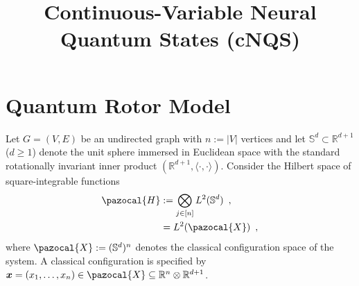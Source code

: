 \documentclass[12pt]{article}
\theoremstyle{definition}%
\theoremstyle{definition}
\theoremstyle{remark}
\begin{document}
\title{Continuous-Variable Neural Quantum States (cNQS)}

\maketitle
\tableofcontents
\section{Quantum Rotor Model}
Let $G = (V,E)$ be an undirected graph with $n:=|V|$ vertices and let $\mathbb{S}^d \subset \mathbb{R}^{d+1}$ ($d \geq 1$) denote the unit sphere immersed in Euclidean space with the standard rotationally invariant inner product $(\mathbb{R}^{d+1}, \langle \cdot, \cdot \rangle)$. Consider the Hilbert space of square-integrable functions
\begin{align}
	\pazocal{H} 
		& := \bigotimes_{j\in[n]} L^2(\mathbb{S}^d) \enspace , \\
		& = L^2(\pazocal{X}) \enspace ,
\end{align}
where $\pazocal{X} := (\mathbb{S}^d)^{n}$ denotes the classical configuration space of the system. A classical configuration is specified by  $\bm{x} = (x_1,\ldots,x_n) \in \pazocal{X} \subseteq \mathbb{R}^n \otimes \mathbb{R}^{d+1}$.
\end{document}
